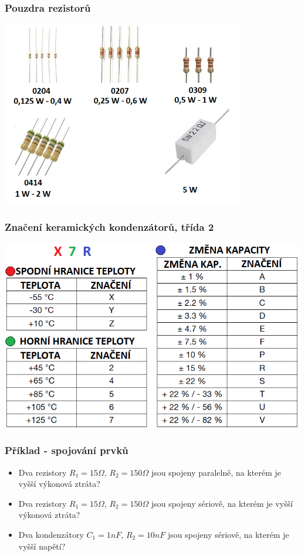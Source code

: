 \documentclass{beamer}
\begin{document}
  \begin{frame}
    \frametitle{Pouzdra rezistorů}
    \begin{center}
      \includegraphics[width=0.8\textwidth]{obr/resistor-wattage.png}
    \end{center}
  \end{frame}
  \begin{frame}
    \frametitle{Značení keramických kondenzátorů, třída 2}
    \begin{center}
      \includegraphics[width=\textwidth]{obr/classII.png}
    \end{center}
  \end{frame}
  \begin{frame}
    \frametitle{Příklad - spojování prvků}
    
    \begin{itemize}
      \item Dva rezistory $R_1 = 15 \Omega$, $R_2 = 150 \Omega$  jsou spojeny 
      paralelně, na kterém je vyšší výkonová ztráta?
      \item Dva rezistory $R_1 = 15 \Omega$, $R_2 = 150 \Omega$  jsou spojeny 
      sériově, na kterém je vyšší výkonová ztráta?
      \item Dva kondenzátory $C_1 = 1 nF$, $R_2 = 10 nF$  jsou spojeny 
      sériově, na kterém je vyšší napětí?
    \end{itemize}
    
  \end{frame}
\end{document}
